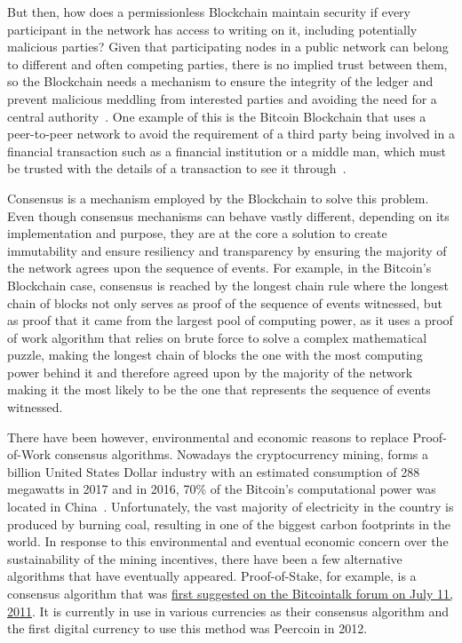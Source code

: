 But then, how does a permissionless Blockchain maintain security if every
participant in the network has access to writing on it, including potentially
malicious parties? Given that participating nodes in a public network can
belong to different and often competing parties, there is no implied trust
between them, so the Blockchain needs a mechanism to ensure the integrity of
the ledger and prevent malicious meddling from interested parties and avoiding
the need for a central authority~\cite{Barclay2017}.  One example of this is
the Bitcoin Blockchain that uses a peer-to-peer network to avoid the
requirement of a third party being involved in a financial transaction such as
a financial institution or a middle man, which must be trusted with the details
of a transaction to see it through~\cite{Nakamoto2008}.

Consensus is a mechanism employed by the Blockchain to solve this problem.
Even though consensus mechanisms can behave vastly different, depending on its
implementation and purpose, they are at the core a solution to create
immutability and ensure resiliency and transparency by ensuring the majority of
the network agrees upon the sequence of events.  For example, in the Bitcoin's
Blockchain case, consensus is reached by the longest chain rule where the
longest chain of blocks not only serves as proof of the sequence of events
witnessed, but as proof that it came from the largest pool of computing power,
as it uses a proof of work algorithm that relies on brute force to solve a
complex mathematical puzzle, making the longest chain of blocks the one with
the most computing power behind it and therefore agreed upon by the majority of
the network~\cite{Baars2016,Wood2017} making it the most likely to be the one
that represents the sequence of events witnessed.

There have been however, environmental and economic reasons to replace
Proof-of-Work consensus algorithms. Nowadays the cryptocurrency mining, forms a
billion United States Dollar industry with an estimated consumption of 288
megawatts in 2017 and in 2016, 70\% of the Bitcoin's computational power was
located in China~\cite{BitcoinMining2017}.  Unfortunately, the vast majority of
electricity in the country is produced by burning coal, resulting in one of the
biggest carbon footprints in the world. In response to this environmental and
eventual economic concern over the sustainability of the mining incentives,
there have been a few alternative algorithms that have eventually appeared.
Proof-of-Stake, for example, is a consensus algorithm that was
\href{https://bitcointalk.org/index.php?topic=27787.0}{first suggested on the
Bitcointalk forum on July 11, 2011}. It is currently in use in various
currencies as their consensus algorithm and the first digital currency to use
this method was Peercoin in 2012. 

